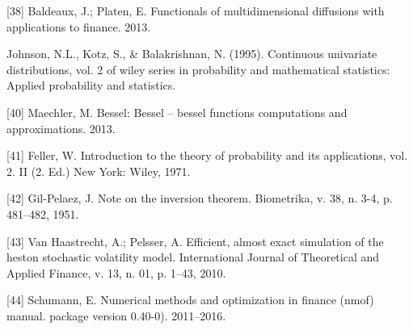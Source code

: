 \documentclass[12pt,twoside]{reedthesis}
\theoremstyle{definition}
\theoremstyle{definition}
\theoremstyle{remark}
\begin{document}
  \hypertarget{ref-baldeaux}{}
  {[}38{]} Baldeaux, J.; Platen, E. Functionals of multidimensional
  diffusions with applications to finance. 2013.
  
  \hypertarget{ref-johnson1995}{}
  Johnson, N.L., Kotz, S., \& Balakrishnan, N. (1995). Continuous
  univariate distributions, vol. 2 of wiley series in probability and
  mathematical statistics: Applied probability and statistics.
  
  \hypertarget{ref-besselpkg}{}
  {[}40{]} Maechler, M. Bessel: Bessel -- bessel functions computations
  and approximations. 2013.
  
  \hypertarget{ref-feller1971introduction}{}
  {[}41{]} Feller, W. Introduction to the theory of probability and its
  applications, vol. 2. II (2. Ed.) New York: Wiley, 1971.
  
  \hypertarget{ref-gil1951note}{}
  {[}42{]} Gil-Pelaez, J. Note on the inversion theorem. Biometrika, v.
  38, n. 3-4, p. 481--482, 1951.
  
  \hypertarget{ref-van2010efficient}{}
  {[}43{]} Van Haastrecht, A.; Pelsser, A. Efficient, almost exact
  simulation of the heston stochastic volatility model. International
  Journal of Theoretical and Applied Finance, v. 13, n. 01, p. 1--43,
  2010.
  
  \hypertarget{ref-nmofpack}{}
  {[}44{]} Schumann, E. Numerical methods and optimization in finance
  (nmof) manual. package version 0.40-0). 2011--2016.


\end{document}
